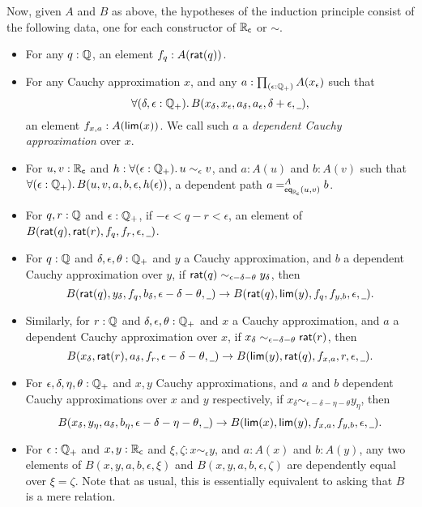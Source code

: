 Now, given $A$ and $B$ as above, the hypotheses of the induction principle consist of the following data, one for each constructor of $\RC$ or $\sim$.
\begin{itemize}
\item For any $q : \Q$, an element $f_q:A(\rcrat(q))$.
\item For any Cauchy approximation $x$, and any $a:\prd{\epsilon:\Qp} A(x_\epsilon)$ such that
  \begin{equation}
    \fall{\delta, \epsilon : \Qp} B(x_\delta,x_\epsilon,a_\delta,a_\epsilon,\delta+\epsilon,\blank),\label{eq:depCauchyappx}
  \end{equation}
  an element $f_{x,a}:A(\rclim(x))$.  We call such $a$ a \emph{dependent Cauchy approximation} over $x$.
\item For $u, v : \RC$ and $h:\fall{\epsilon : \Qp} u \sim_\epsilon v$, and $a:A(u)$ and $b:A(v)$ such that $\fall{\epsilon:\Qp} B(u,v,a,b,\epsilon,h(\epsilon))$, a dependent path $\dpath{A}{\rceq(u,v)}{a}{b}$.
\item For $q,r:\Q$ and $\epsilon:\Qp$, if $-\epsilon < q - r < \epsilon$, an element of $B(\rcrat(q),\rcrat(r),f_q,f_r,\epsilon,\blank)$.
\item For $q:\Q$ and $\delta,\epsilon,\theta:\Qp$ and $y$ a Cauchy approximation, and $b$ a dependent Cauchy approximation over $y$, if $\rcrat(q) \sim_{\epsilon - \delta - \theta} y_\delta$, then
  \[B(\rcrat(q),y_\delta,f_q,b_\delta,\epsilon-\delta-\theta,\blank)
  \to
  B(\rcrat(q),\rclim(y),f_q,f_{y,b},\epsilon,\blank).\]
\item Similarly, for $r:\Q$ and $\delta,\epsilon,\theta:\Qp$ and $x$ a Cauchy approximation, and $a$ a dependent Cauchy approximation over $x$, if $x_\delta \sim_{\epsilon - \delta - \theta} \rcrat(r)$, then
  \[B(x_\delta,\rcrat(r),a_\delta,f_r,\epsilon-\delta-\theta,\blank) \to
  B(\rclim(y),\rcrat(q),f_{x,a},r,\epsilon,\blank).
  \]
\item For $\epsilon,\delta,\eta,\theta:\Qp$ and $x,y$ Cauchy approximations, and $a$ and $b$ dependent Cauchy approximations over $x$ and $y$ respectively, if $x_\delta \sim_{\epsilon - \delta - \eta - \theta} y_\eta$, then
  \[ B(x_\delta,y_\eta,a_\delta,b_\eta,{\epsilon - \delta - \eta - \theta},\blank)\to
  B(\rclim(x),\rclim(y),f_{x,a},f_{y,b},\epsilon,\blank).\]
\item For $\epsilon:\Qp$ and $x,y:\RC$ and $\xi,\zeta:x\sim_{\epsilon} y$, and $a:A(x)$ and $b:A(y)$, any two elements of $B(x,y,a,b,\epsilon,\xi)$ and $B(x,y,a,b,\epsilon,\zeta)$ are dependently equal over $\xi=\zeta$.
  Note that as usual, this is essentially equivalent to asking that $B$ is a mere relation.
\end{itemize}
